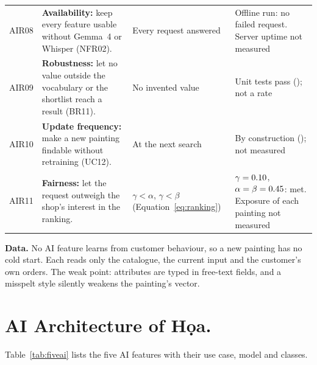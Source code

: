 \begin{longtable}{@{}P{1.15cm}P{5.3cm}P{3.45cm}P{5.1cm}@{}}
\small AIR08 & \small \textbf{Availability:} keep every feature usable without Gemma~4 or Whisper (NFR02). & \small Every request answered & \small Offline run: no failed request. Server uptime not measured\\
\small AIR09 & \small \textbf{Robustness:} let no value outside the vocabulary or the shortlist reach a result (BR11). & \small No invented value & \small Unit tests pass (); not a rate\\
\small AIR10 & \small \textbf{Update frequency:} make a new painting findable without retraining (UC12). & \small At the next search & \small By construction (); not measured\\
\small AIR11 & \small \textbf{Fairness:} let the request outweigh the shop's interest in the ranking. & \small $\gamma<\alpha$, $\gamma<\beta$ (Equation~\ref{eq:ranking}) & \small $\gamma=0.10$, $\alpha=\beta=0.45$: met. Exposure of each painting not measured\\
\bottomrule
\end{longtable}

\textbf{Data.} No AI feature learns from customer behaviour, so a new painting has no cold start. Each reads only
the catalogue, the current input and the customer's own orders. The weak point: attributes are typed in free-text
fields, and a misspelt style silently weakens the painting's vector.

\section{AI Architecture of Họa.}\label{sec:3.3}

Table~\ref{tab:fiveai} lists the five AI features with their use case, model and classes.

